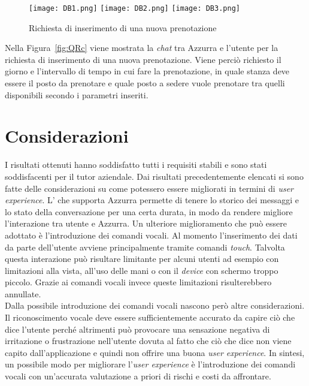\begin{figure}[h]
	\begin{center}
		\texttt{[image: DB1.png]}\hfill
		\texttt{[image: DB2.png]}\hfill
		\texttt{[image: DB3.png]}
		\caption{Richiesta di inserimento di una nuova prenotazione}\label{fig:DB}
	\end{center}
\end{figure}
\clearpage
Nella Figura~\ref{fig:QRc} viene mostrata la \emph{chat} tra Azzurra e l'utente per la richiesta di inserimento di una nuova prenotazione. Viene perciò richiesto il giorno e l'intervallo di tempo in cui fare la prenotazione, in quale stanza deve essere il posto da prenotare e quale posto a sedere vuole prenotare tra quelli disponibili secondo i parametri inseriti.

\section{Considerazioni}
\label{cap:cons1}
I risultati ottenuti hanno soddisfatto tutti i requisiti stabili e sono stati soddisfacenti per il tutor aziendale. Dai risultati precedentemente elencati si sono fatte delle considerazioni su come potessero essere migliorati in termini di \emph{user experience}. L' che supporta Azzurra permette di tenere lo storico dei messaggi e lo stato della conversazione per una certa durata, in modo da rendere migliore l'interazione tra utente e Azzurra. Un ulteriore miglioramento che può essere adottato è l'introduzione dei comandi vocali. Al momento l'inserimento dei dati da parte dell'utente avviene principalmente tramite comandi \emph{touch}. Talvolta questa interazione può risultare limitante per alcuni utenti ad esempio con limitazioni alla vista, all'uso delle mani o con il \emph{device} con schermo troppo piccolo. Grazie ai comandi vocali invece queste limitazioni risulterebbero annullate. \\

Dalla possibile introduzione dei comandi vocali nascono però altre considerazioni. Il riconoscimento vocale deve essere sufficientemente accurato da capire ciò che dice l'utente perché altrimenti può provocare una sensazione negativa di irritazione o frustrazione nell'utente dovuta al fatto che ciò che dice non viene capito dall'applicazione e quindi non offrire una buona \emph{user experience}. In sintesi, un possibile modo per migliorare l'\emph{user experience} è l'introduzione dei comandi vocali con un'accurata valutazione a priori di rischi e costi da affrontare.

